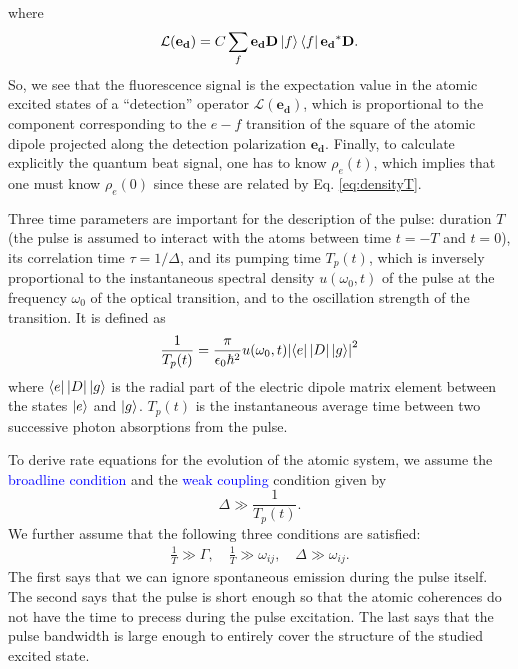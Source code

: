 \documentclass[11pt]{article}
\newcommand{\lag}{\mathcal{L}}
\newcommand{\f}[2]{\frac{#1}{#2}}
\begin{document}
where 
\begin{equation*}
\lag(\mathbf{e_d}) = C\sum_f \mathbf{e_d} \mathbf{D}\ket{f}\bra{f}\mathbf{e_d}^* \mathbf{D}.
\end{equation*}
So, we see that the fluorescence signal is the expectation value in the atomic excited states of a ``detection'' operator $\lag(\mathbf{e_d})$, which is proportional to the component corresponding to the $e-f$ transition of the square of the atomic dipole projected along the detection polarization $\mathbf{e_d}$. Finally, to calculate explicitly the quantum beat signal, one has to know $\rho_e(t)$, which implies that one must know $\rho_e(0)$ since these are related by Eq. \ref{eq:densityT}.


Three time parameters are important for the description of the pulse: duration $T$ (the pulse is assumed to interact with the atoms between time $t=-T$ and $t=0$), its correlation time $\tau = 1/\Delta$, and its pumping time $T_p(t)$, which is inversely proportional to the instantaneous spectral density $u(\omega_0,t)$ of the pulse at the frequency $\omega_0$ of the optical transition, and to the oscillation strength of the transition. It is defined as
\begin{equation*}
\f{1}{T_p(t)} = \f{\pi}{\epsilon_0 \hbar^2} u(\omega_0,t) \abs{ \bra{e} \abs{D} \ket{g}}^2
\end{equation*}
where $\bra{e} \abs{D} \ket{g}$ is the radial part of the electric dipole matrix element between the states $\ket{e}$ and $\ket{g}$. $T_p(t)$ is the instantaneous average time between two successive photon absorptions from the pulse. 

To derive rate equations for the evolution of the atomic system, we assume the \textcolor{blue}{broadline condition} and the \textcolor{blue}{weak coupling} condition given by 
\begin{equation*}
\Delta \gg \f{1}{T_p(t)}. 
\end{equation*}
We further assume that the following three conditions are satisfied:
\begin{align*}
\f{1}{T} \gg \Gamma, \quad \f{1}{T} \gg \omega_{ij}, \quad \Delta \gg \omega_{ij}.
\end{align*}
The first says that we can ignore spontaneous emission during the pulse itself. The second says that the pulse is short enough so that the atomic coherences do not have the time to precess during the pulse excitation. The last says that the pulse bandwidth is large enough to entirely cover the structure of the studied excited state. 
\end{document}
